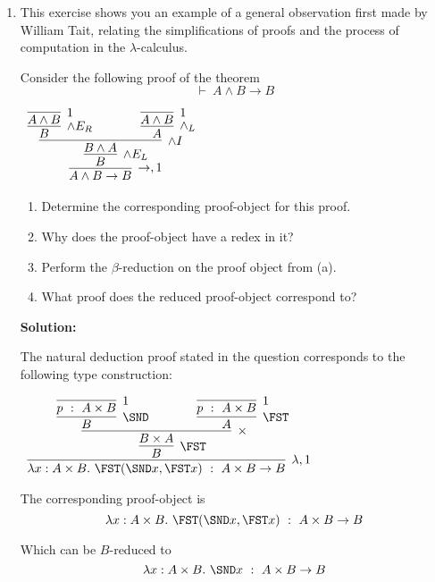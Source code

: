 \documentclass[11pt]{report}
\begin{document}
\begin{enumerate}
	\newpage
	\item This exercise shows you an example of a general observation first made by William Tait, relating the simplifications of proofs and the process of computation in the $\lambda$-calculus. 
	
	Consider the following proof of the theorem $$\vdash \ A \land B \to B$$
	
	\begin{center}
		$\begin{array}{c}		
		  \infer[\to, 1]{A \land B \to B}
		  	{\infer[\land E_{L}]{B}
				{\infer[\land I]{B \land A}
					{\infer[\land E_{R}]{B}{\infer[1]{A \land B}{}} 
					\hspace{0.5cm}	&	\hspace{0.5cm}
					\infer[\land_{L}]{A}{\infer[1]{A \land B}{}}}}}
		\end{array}$
	  \end{center}

	  	\begin{enumerate}
			\item Determine the corresponding proof-object for this proof. 
			\item Why does the proof-object have a redex in it? 
			\item Perform the $\beta$-reduction on the proof object from (a).
			\item What proof does the reduced proof-object correspond to?
		\end{enumerate}

		{\bf Solution:}

		The natural deduction proof stated in the question corresponds to the following type construction:

		\begin{center}
			$\begin{array}{c}		
				\infer[\lambda, 1]{\lambda x : A \times B. \ \FST (\SND x, \FST x) \ : \ A \times B \to B}
					{\infer[\FST]{B}
					{\infer[\times]{B \times A}
						{\infer[\SND]{B}{\infer[1]{p \ : \ A \times B}{}} 
						\hspace{0.5cm}	&	\hspace{0.5cm}
						\infer[\FST]{A}{\infer[1]{p \ : \ A \times B}{}}}}}
			\end{array}$
		\end{center}

		The corresponding proof-object is $$\lambda x : A \times B. \ \FST (\SND x, \FST x) \ : \ A \times B \to B$$

		Which can be $ B$-reduced to $$\lambda x : A \times B. \ \SND x \ : \ A \times B \to B$$


\end{enumerate}
\end{document}
